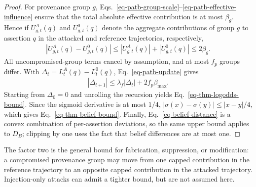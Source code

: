\begin{proof}
For provenance group $g$, Eqs.~\ref{eq-patb-group-scale}--\ref{eq-patb-effective-influence} ensure that the total absolute effective contribution is at most $\beta_g$. Hence if $U_{g,t}^A(q)$ and $U_{g,t}^0(q)$ denote the aggregate contributions of group $g$ to assertion $q$ in the attacked and reference trajectories, respectively,
\begin{align}
|U_{g,t}^A(q)-U_{g,t}^0(q)|
\le |U_{g,t}^A(q)|+|U_{g,t}^0(q)|
\le 2\beta_g.
\end{align}
All uncompromised-group terms cancel by assumption, and at most $f_p$ groups differ. With $\Delta_t=L_t^A(q)-L_t^0(q)$, Eq.~\ref{eq-patb-update} gives
\begin{align}
|\Delta_{t+1}|\le\lambda_f|\Delta_t|+2f_p\beta_{\max}.
\end{align}
Starting from $\Delta_0=0$ and unrolling the recursion yields Eq.~\ref{eq-thm-logodds-bound}. Since the sigmoid derivative is at most $1/4$, $|\sigma(x)-\sigma(y)|\le|x-y|/4$, which gives Eq.~\ref{eq-thm-belief-bound}. Finally, Eq.~\ref{eq-belief-distance} is a convex combination of per-assertion deviations, so the same upper bound applies to $D_B$; clipping by one uses the fact that belief differences are at most one.
\end{proof}

The factor two is the general bound for fabrication, suppression, or modification: a compromised provenance group may move from one capped contribution in the reference trajectory to an opposite capped contribution in the attacked trajectory. Injection-only attacks can admit a tighter bound, but are not assumed here.

